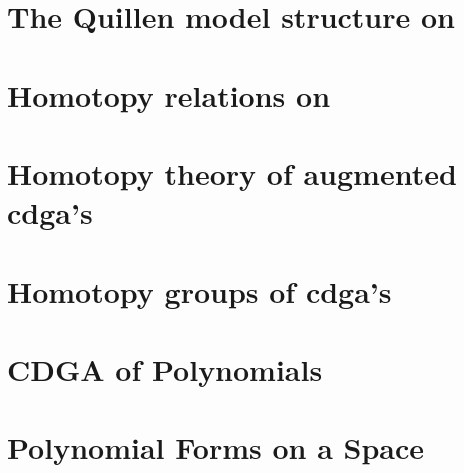 \section{The Quillen model structure on \titleCDGA}


\section{Homotopy relations on \titleCDGA}


\section{Homotopy theory of augmented cdga's}


\section{Homotopy groups of cdga's}



\label{sec:cdga-of-polynomials}

\section{CDGA of Polynomials}


\section{Polynomial Forms on a Space}
\label{sec:polynomial-forms}





